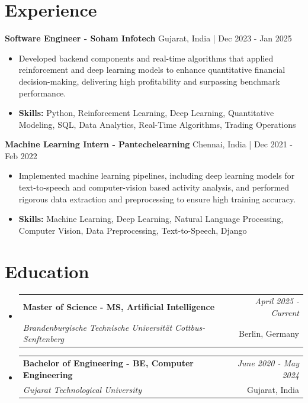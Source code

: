 \documentclass[a4paper,11pt]{article}
\makeatletter
\newcommand{\resumeSubheading}[4]{
\vspace{0.5mm}\item
    \begin{tabular*}{0.98\textwidth}[t]{l@{\extracolsep{\fill}}r}
        \textbf{#1} & \textit{\footnotesize{#4}} \\
        \textit{\footnotesize{#3}} &  \footnotesize{#2}\\
    \end{tabular*}
    \vspace{-2.4mm}
}
\makeatother
\begin{document}
\section{\textbf{Experience}}


\vspace{1mm}
  \textbf{Software Engineer - Soham Infotech} \hfill Gujarat, India | Dec 2023 - Jan 2025
\vspace{-1.5mm} %
\begin{itemize}
  \item Developed backend components and real-time algorithms that applied reinforcement and deep learning models to enhance quantitative financial decision-making, delivering high profitability and surpassing benchmark performance.

\vspace{-2mm}
  \item \textbf{Skills:} Python, Reinforcement Learning, Deep Learning, Quantitative Modeling, SQL, Data Analytics, Real-Time Algorithms, Trading Operations
\end{itemize}

\vspace{1mm}
  \textbf{Machine Learning Intern - Pantechelearning} \hfill Chennai, India | Dec 2021 - Feb 2022
\vspace{-1.5mm} %
\begin{itemize}
  \item Implemented machine learning pipelines, including deep learning models for text-to-speech and computer-vision based activity analysis, and performed rigorous data extraction and preprocessing to ensure high training accuracy.
\vspace{-2mm}
  \item \textbf{Skills:} Machine Learning, Deep Learning, Natural Language Processing, Computer Vision, Data Preprocessing, Text-to-Speech, Django
\end{itemize}\section{\textbf{Education}}
\vspace{-0.4mm}

\begin{itemize}
\resumeSubheading
{Master of Science - MS, Artificial Intelligence }{Berlin, Germany}
{Brandenburgische Technische Universität Cottbus-Senftenberg  }{April 2025 - Current}

\vspace{1.0mm} %
\resumeSubheading
{Bachelor of Engineering - BE, Computer Engineering  }{Gujarat, India}
{Gujarat Technological University }{June 2020 - May 2024}

\end{itemize}
\end{document}
